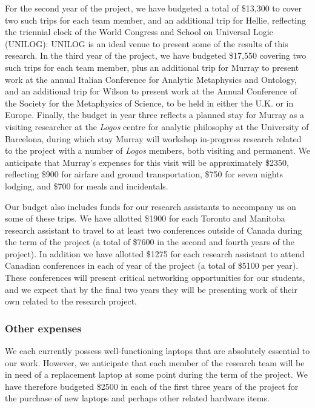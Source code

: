 \documentclass[12pt]{article}
\begin{document}
For the second year of the project, we have budgeted a total of \$13,300 to
cover two such trips for each team member, and an additional trip for Hellie,
reflecting the triennial clock of the World
Congress and School on Universal Logic (UNILOG): UNILOG is an ideal venue to
present some of the results of this research.
In the third year of the project, we have budgeted \$17,550 covering two such trips
for each team member, plus an additional trip for Murray to present work at
the annual Italian Conference for Analytic Metaphysics and Ontology, and
an additional trip for
Wilson to present work at the Annual Conference of the Society for the
Metaphysics of Science, to be held in either the
U.K. or in Europe. Finally, the budget in year three reflects a planned stay
for Murray as a visiting researcher at the \emph{Logos} centre for analytic philosophy at the
University of Barcelona, during which stay Murray will workshop in-progress
research related to the project with a number of \emph{Logos} members, both
visiting and permanent.  We anticipate that Murray's expenses for this visit
will be approximately \$2350, reflecting \$900 for airfare and ground
transportation, \$750 for seven nights lodging, and \$700 for meals and
incidentals.  
 
Our budget also includes funds for our research assistants to accompany us on
some of these trips. We have allotted \$1900 for each Toronto and Manitoba
research assistant to travel to at least two conferences outside of Canada
during the term of the project (a total of \$7600 in the second and fourth
years of the project).  In addition we have allotted \$1275 for each research
assistant to attend Canadian conferences in each of year of the project (a
total of \$5100 per year). These conferences will present critical networking
opportunities for our students, and we expect that by the final two years they
will be presenting work of their own related to the research project.

 


\subsubsection*{Other expenses}

We each currently possess well-functioning laptops that are absolutely essential to 
our work. However, we anticipate that each member of the research team
will be in need of a replacement laptop at some point during the term of the
project. We have therefore budgeted \$2500 in each of the first three years
of the project for the purchase of new laptops and perhaps other related
hardware items.
\end{document}

